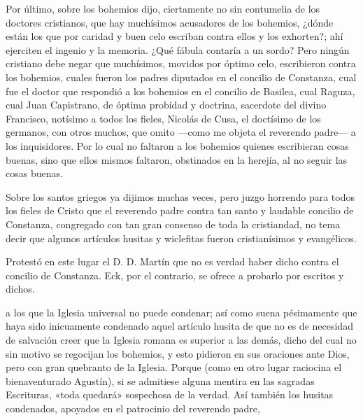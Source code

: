 Por último, sobre los bohemios dijo, ciertamente no sin contumelia de los doctores cristianos, que hay muchísimos acusadores de los bohemios, ¿dónde están los que por caridad y buen celo escriban contra ellos y los exhorten?; ahí ejerciten el ingenio y la memoria. ¿Qué fábula contaría a un sordo? Pero ningún cristiano debe negar que muchísimos, movidos por óptimo celo, escribieron contra los bohemios, cuales fueron los padres diputados en el concilio de Constanza, cual fue el doctor que respondió a los bohemios en el concilio de Basilea, cual Raguza, cual Juan Capistrano, de óptima probidad y doctrina, sacerdote del divino Francisco, notísimo a todos los fieles, Nicolás de Cusa, el doctísimo de los germanos, con otros muchos, que omito —como me objeta el reverendo padre— a los inquisidores. Por lo cual no faltaron a los bohemios quienes escribieran cosas buenas, sino que ellos mismos faltaron, obstinados en la herejía, al no seguir las cosas buenas.

Sobre los santos griegos ya dijimos muchas veces, pero juzgo horrendo para todos los fieles de Cristo que el reverendo padre contra tan santo y laudable concilio de Constanza, congregado con tan gran consenso de toda la cristiandad, no tema decir que algunos artículos husitas y wiclefitas fueron cristianísimos y evangélicos.

Protestó en este lugar el D. D. Martín que no es verdad haber dicho contra el concilio de Constanza. Eck, por el contrario, se ofrece a probarlo por escritos y dichos.

a los que la Iglesia universal no puede condenar; así como suena pésimamente que haya sido inicuamente condenado aquel artículo husita de que no es de necesidad de salvación creer que la Iglesia romana es superior a las demás, dicho del cual no sin motivo se regocijan los bohemios, y esto pidieron en sus oraciones ante Dios, pero con gran quebranto de la Iglesia. Porque (como en otro lugar raciocina el bienaventurado Agustín), si se admitiese alguna mentira en las sagradas Escrituras, «toda quedará» sospechosa de la verdad. Así también los husitas condenados, apoyados en el patrocinio del reverendo padre,

